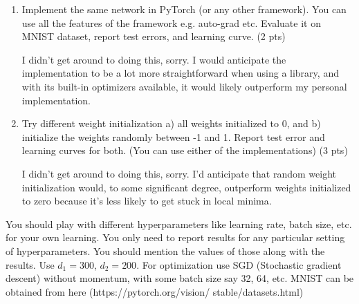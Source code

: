 \documentclass[a4paper]{article}
\theoremstyle{definition}
\newenvironment{soln}{
    \leavevmode\color{blue}\ignorespaces
}{}
\begin{document}
\begin{enumerate}
    \item Implement the same network in PyTorch (or any other framework). You can use all the features of the framework e.g. auto-grad etc. Evaluate it on MNIST dataset, report test errors, and learning curve. (2 pts)
    
    \begin{soln}
    	I didn't get around to doing this, sorry.
    	I would anticipate the implementation to be a lot more straightforward when using a library, and with its built-in optimizers available, it would likely outperform my personal implementation.
    \end{soln}
    
    \item Try different weight initialization a) all weights initialized to 0, and b) initialize the weights randomly between -1 and 1. Report test error and learning curves for both. (You can use either of the implementations) (3 pts)
    
    \begin{soln}
    	I didn't get around to doing this, sorry.
    	I'd anticipate that random weight initialization would, to some significant degree, outperform weights initialized to zero because it's less likely to get stuck in local minima.
    \end{soln}
    
\end{enumerate}

You should play with different hyperparameters like learning rate, batch size, etc. for your own learning. You only need to report results for any particular setting of hyperparameters. You should mention the values of those along with the results. Use $d_1 = 300$, $d_2 = 200$. For optimization use SGD (Stochastic gradient descent) without momentum, with some batch size say 32, 64, etc. MNIST can be obtained from here (https://pytorch.org/vision/ stable/datasets.html)


\end{document}
